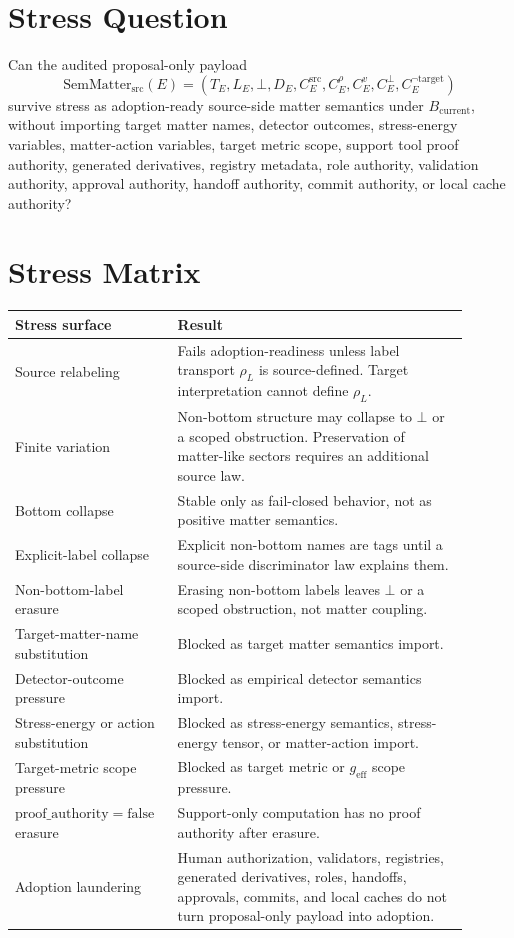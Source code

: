 \documentclass[11pt]{article}
\newcommand{\geff}{g_{\mathrm{eff}}}
\newcommand{\SemMatterSrc}{\mathrm{SemMatter}_{\mathrm{src}}}
\newcommand{\Bottom}{\bot}
\newcommand{\Bcur}{B_{\mathrm{current}}}
\newcommand{\ProofAuthFalse}{\mathrm{proof\_authority=false}}
\begin{document}
\section{Stress Question}

Can the audited proposal-only payload
\[
  \SemMatterSrc(E)=(T_E,L_E,\Bottom,D_E,
  C^{\mathrm{src}}_E,C^{\rho}_E,C^v_E,C^\bot_E,
  C^{\neg\mathrm{target}}_E)
\]
survive stress as adoption-ready source-side matter semantics under
\(\Bcur\), without importing target matter names, detector outcomes,
stress-energy variables, matter-action variables, target metric scope, support
tool proof authority, generated derivatives, registry metadata, role
authority, validation authority, approval authority, handoff authority, commit
authority, or local cache authority?

\section{Stress Matrix}

\begin{longtable}{p{0.30\linewidth}p{0.60\linewidth}}
\toprule
Stress surface & Result \\
\midrule
Source relabeling & Fails adoption-readiness unless label transport
\(\rho_L\) is source-defined. Target interpretation cannot define
\(\rho_L\). \\
Finite variation & Non-bottom structure may collapse to \(\Bottom\) or a
scoped obstruction. Preservation of matter-like sectors requires an additional
source law. \\
Bottom collapse & Stable only as fail-closed behavior, not as positive matter
semantics. \\
Explicit-label collapse & Explicit non-bottom names are tags until a
source-side discriminator law explains them. \\
Non-bottom-label erasure & Erasing non-bottom labels leaves \(\Bottom\) or a
scoped obstruction, not matter coupling. \\
Target-matter-name substitution & Blocked as target matter semantics import. \\
Detector-outcome pressure & Blocked as empirical detector semantics import. \\
Stress-energy or action substitution & Blocked as stress-energy semantics,
stress-energy tensor, or matter-action import. \\
Target-metric scope pressure & Blocked as target metric or \(\geff\) scope
pressure. \\
\(\ProofAuthFalse\) erasure & Support-only computation has no proof
authority after erasure. \\
Adoption laundering & Human authorization, validators, registries, generated
derivatives, roles, handoffs, approvals, commits, and local caches do not turn
proposal-only payload into adoption. \\
\bottomrule
\end{longtable}
\end{document}
